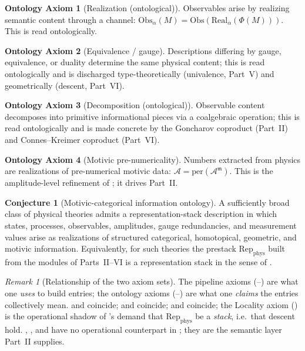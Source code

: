 \documentclass[12pt]{article}
\theoremstyle{definition}
\newtheorem{ontaxiom}{Ontology Axiom}
\newtheorem{conjecture}[theorem]{Conjecture}
\theoremstyle{remark}
\newtheorem{remark}[theorem]{Remark}
\newcommand{\Real}{\mathrm{Real}}
\newcommand{\Obs}{\mathrm{Obs}}
\newcommand{\Repphys}{\mathrm{Rep}_{\mathrm{phys}}}
\newcommand{\per}{\mathrm{per}}
\begin{document}
\begin{ontaxiom}[Realization (ontological)]
\label{ax:real-ont}
Observables arise by realizing semantic content through a channel:
$\Obs_\alpha(M) = \Obs(\Real_\alpha(\Phi(M)))$. This is  read
ontologically.
\end{ontaxiom}

\begin{ontaxiom}[Equivalence / gauge]
\label{ax:equiv-ont}
Descriptions differing by gauge, equivalence, or duality determine the same
physical content; this is  read ontologically and is discharged
type-theoretically (univalence, Part~V) and geometrically (descent, Part~VI).
\end{ontaxiom}

\begin{ontaxiom}[Decomposition (ontological)]
\label{ax:decomp-ont}
Observable content decomposes into primitive informational pieces via a
coalgebraic operation; this is  read ontologically and is made
concrete by the Goncharov coproduct (Part~II) and Connes--Kreimer coproduct
(Part~VI).
\end{ontaxiom}

\begin{ontaxiom}[Motivic pre-numericality]
\label{ax:motivic}
Numbers extracted from physics are realizations of pre-numerical motivic data:
$\mathcal{A} = \per(\mathcal{A}^{\mathfrak m})$. This is the amplitude-level
refinement of ; it drives Part~II.
\end{ontaxiom}

\begin{conjecture}[Motivic-categorical information ontology]
\label{conj:closure}
A sufficiently broad class of physical theories admits a representation-stack
description in which states, processes, observables, amplitudes, gauge
redundancies, and measurement values arise as realizations of structured
categorical, homotopical, geometric, and motivic information. Equivalently, for
such theories the prestack $\Repphys$ built from the modules of Parts~II--VI is a
representation stack in the sense of .
\end{conjecture}

\begin{remark}[Relationship of the two axiom sets]
The pipeline axioms (--) are what one \emph{uses}
to build entries; the ontology axioms (--) are
what one \emph{claims} the entries collectively mean.  and
 coincide;  and  coincide;
 and  coincide; the Locality axiom
() is the operational shadow of 's demand that
$\Repphys$ be a \emph{stack}, i.e.\ that descent hold. ,
, and  have no operational counterpart in
; they are the semantic layer Part~II supplies.
\end{remark}
\end{document}
